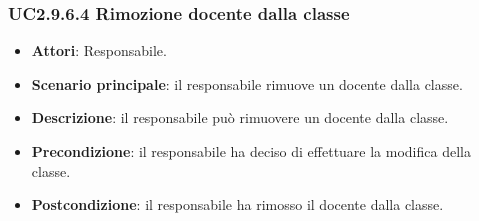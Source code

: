 \subsubsection{UC2.9.6.4 Rimozione docente dalla classe}
\begin{itemize}
\item \textbf{Attori}: Responsabile.
\item \textbf{Scenario principale}: il responsabile rimuove un docente dalla classe.
\item \textbf{Descrizione}: il responsabile può rimuovere un docente dalla classe.
\item \textbf{Precondizione}: il responsabile ha deciso di effettuare la modifica della classe.
\item \textbf{Postcondizione}: il responsabile ha rimosso il docente dalla classe.
\end{itemize}
